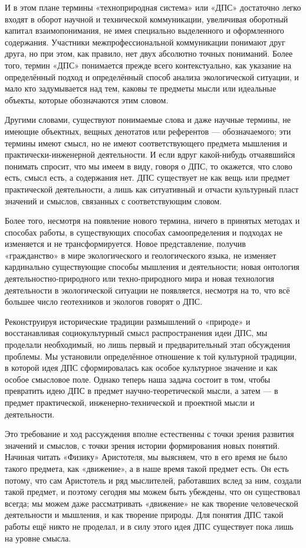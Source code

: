\documentclass[11pt,a4paper]{article}
\begin{document}
И в этом плане термины «техноприродная система» или «ДПС» достаточно легко
входят в оборот научной и технической коммуникации, увеличивая оборотный
капитал взаимопонимания, не имея специально выделенного и оформленного
содержания. Участники межпрофессиональной коммуникации понимают друг друга, но
при этом, как правило, нет двух абсолютно точных пониманий. Более того, термин
«ДПС» понимается прежде всего контекстуально, как указание на определённый
подход и определённый способ анализа экологической ситуации, и мало кто
задумывается над тем, каковы те предметы мысли или идеальные объекты, которые
обозначаются этим словом. 

Другими словами, существуют понимаемые слова и даже научные термины, не
имеющие объектных, вещных денотатов или референтов — обозначаемого; эти
термины имеют смысл, но не имеют соответствующего предмета мышления и
практически-инженерной деятельности. И если вдруг какой-нибудь отчаявшийся
понимать спросит, что мы имеем в виду, говоря о ДПС, то окажется, что слово
есть, смысл есть, а содержания нет. ДПС существует не как вещь или предмет
практической деятельности, а лишь как ситуативный и отчасти культурный пласт
значений и смыслов, связанных с соответствующим словом. 

Более того, несмотря на появление нового термина, ничего в принятых методах и
способах работы, в существующих способах самоопределения и подходах не
изменяется и не трансформируется. Новое представление, получив «гражданство» в
мире экологического и геологического языка, не изменяет кардинально
существующие способы мышления и деятельности; новая онтология
деятельностно-природного или техно-природного мира и новая технология
деятельности в экологической ситуации не появляется, несмотря на то, что всё
большее число геотехников и экологов говорят о ДПС. 

Реконструируя исторические традиции размышлений о «природе» и восстанавливая
социокультурный смысл распространения идеи ДПС, мы проделали необходимый, но
лишь первый и предварительный этап обсуждения проблемы. Мы установили
определённое отношение к той культурной традиции, в которой идея ДПС
сформировалась как особое культурное значение и как особое смысловое поле.
Однако теперь наша задача состоит в том, чтобы превратить идею ДПС в предмет
научно-теоретической мысли, а затем — в предмет практической,
инженерно-технической и проектной мысли и деятельности.

Это требование и ход рассуждения вполне естественны с точки зрения развития
значений и смыслов, с точки зрения истории формирования новых понятий. Начиная
читать «Физику» Аристотеля, мы выясняем, что в его время не было такого
предмета, как «движение», а в наше время такой предмет есть. Он есть потому,
что сам Аристотель и ряд мыслителей, работавших вслед за ним, создали такой
предмет, и поэтому сегодня мы можем быть убеждены, что он существовал всегда;
мы можем даже рассматривать «движение» не как творение человеческой
деятельности и мышления, и как творение природы. Для понятия ДПС такой работы
ещё никто не проделал, и в силу этого идея ДПС существует пока лишь на уровне
смысла. 
\end{document}
